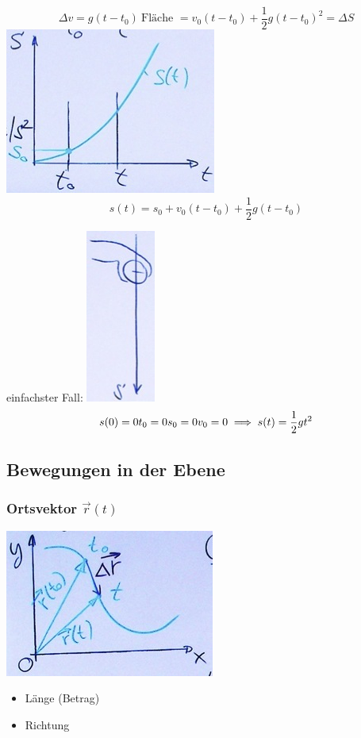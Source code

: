 \begin{bsp*}[note = Der freie Fall]
\[		\Delta v = g( t - t_0 ) \
		\text{Fläche } = v_0 ( t - t_0 ) + \frac{1}{2} g( t - t_0 )^2 = \Delta S
	\]
	\includegraphics{Bild11}
	\[ s(t) = s_0 + v_0 ( t - t_0 ) + \frac{1}{2} g( t - t_0 ) \]
	
	einfachster Fall:
	\includegraphics{Bild12}
	\[
		s(0) = 0 \\
		t_0 = 0 \\
		s_0 = 0 \\
		v_0 = 0 \\
		\implies s(t) = \frac{1}{2} gt^2
	\]
\end{bsp*}

\subsection{Bewegungen in der Ebene}
\subsubsection{Ortsvektor \texorpdfstring{$\vec{r}(t)$}{r(t)}}
\includegraphics{Bild13}
\begin{itemize}[label = $\rightarrow$]
	\item Länge (Betrag)
	\item Richtung
\end{itemize}

